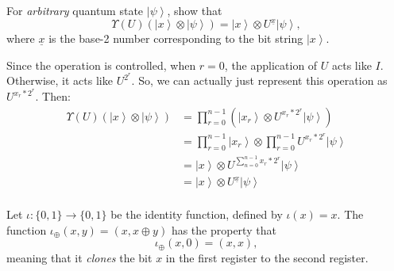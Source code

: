 \documentclass{exam} %
\theoremstyle{plain}
\theoremstyle{definition}
\theoremstyle{remark}
\numberwithin{equation}{section}  %
\newcommand{\ket}[1]{ \left| #1 \right> }
\begin{document}
\begin{questions}
For \emph{arbitrary} quantum state $\ket{\psi}$, show that
\[
  \Upsilon(U)(\ket{x}\otimes \ket{\psi}) 
   = \ket{x}\otimes U^{\underline{x}} \ket{\psi},
\]
where $\underline{x}$ is the base-2 number corresponding to the bit string
$\ket{x}$.
\begin{solution}
  Since the operation is controlled, when $r = 0$, the application of $U$ acts
  like $I$. Otherwise, it acts like $U^{2^r}$. So, we can actually just represent
  this operation as $U^{x_r * 2^r}$. Then:
  \begin{align*}
    \Upsilon(U)(\ket{x}\otimes \ket{\psi}) 
    &=
    \prod_{r=0}^{n-1}(\ket{x_r} \otimes U^{x_r * 2^r}\ket{\psi}) \\
    &=
    \prod_{r=0}^{n-1}\ket{x_r} \otimes \prod_{r=0}^{n-1}U^{x_r * 2^r}\ket{\psi}\\
    &=
    \ket{x} \otimes U^{\sum_{n=0}^{n-1} x_r * 2^r}\ket{\psi}\\
    &=
    \ket{x} \otimes U^{\underline{x}}\ket{\psi}\\
  \end{align*}
\end{solution}
\question Let $\iota: \{0,1\} \to \{0,1\}$ be the identity function, defined
by $\iota(x) = x$. The function $\iota_{\oplus}(x,y) = (x, x\oplus y)$ has
the property that
\[
  \iota_{\oplus}(x,0)
  = (x, x),
\]
meaning that it \emph{clones} the bit $x$ in the first register to the
second register.

\bigskip


\end{questions}
\end{document}

